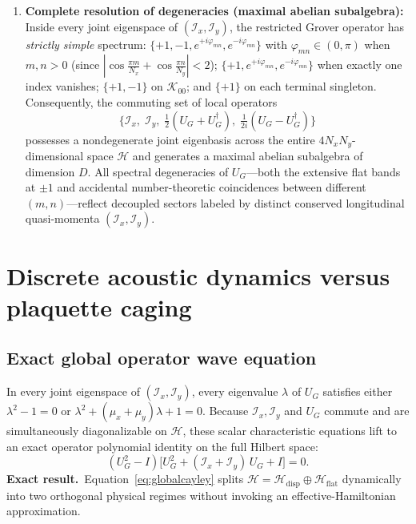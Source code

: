 \documentclass[11pt,a4paper,oneside]{report}
\newcommand{\HH}{\mathcal H}
\newcommand{\Id}{I}
\newcommand{\sw}{\mathrm{SW}}
\newcommand{\exact}{\textbf{Exact result.}\ }
\numberwithin{equation}{chapter}
\begin{document}
\begin{enumerate}
\begin{center}
\begin{tabular}{@{}llll@{}}
\(\big(\cos\frac{\pi m}{N_x},\,-1\big)\) & \(0\le m<N_x\) & \(\mathcal E_m^V\) & \(1\)\\\bottomrule
\end{tabular}
\end{center}
By Lagrange interpolation over the distinct pairs \((\mu_x,\mu_y)\), every
mode projector \(P_a\in\mathscr P_{\sw}\) is an explicit bivariate
polynomial in \(\mathcal I_x\) and \(\mathcal I_y\): the entire commutative
standing-wave algebra \(\mathcal A_{\sw}\) is generated by just two local
integrals of motion.
\item \textbf{Complete resolution of degeneracies (maximal abelian subalgebra):}
Inside every joint eigenspace of \((\mathcal I_x,\mathcal I_y)\), the
restricted Grover operator has \emph{strictly simple} spectrum:
\(\{+1,-1,e^{+i\varphi_{mn}},e^{-i\varphi_{mn}}\}\) with
\(\varphi_{mn}\in(0,\pi)\) when \(m,n>0\) (since
\(|\cos\tfrac{\pi m}{N_x}+\cos\tfrac{\pi n}{N_y}|<2\));
\(\{+1,e^{+i\varphi_{mn}},e^{-i\varphi_{mn}}\}\) when exactly one index
vanishes; \(\{+1,-1\}\) on \(\mathcal K_{00}\); and \(\{+1\}\) on each
terminal singleton. Consequently, the commuting set of local operators
\begin{equation}
\Big\{\mathcal I_x,\;\mathcal I_y,\;\tfrac12(U_G+U_G^\dagger),\;
\tfrac1{2i}(U_G-U_G^\dagger)\Big\}
\end{equation}
possesses a nondegenerate joint eigenbasis across the entire
\(4N_xN_y\)-dimensional space \(\HH\) and generates a maximal abelian
subalgebra of dimension \(D\). All spectral degeneracies of \(U_G\)---both
the extensive flat bands at \(\pm1\) and accidental number-theoretic
coincidences between different \((m,n)\)---reflect decoupled sectors labeled
by distinct conserved longitudinal quasi-momenta \((\mathcal I_x,\mathcal I_y)\).
\end{enumerate}

\section{Discrete acoustic dynamics versus plaquette caging}
\label{sec:acousticsplaquettes}

\subsection{Exact global operator wave equation}

In every joint eigenspace of \((\mathcal I_x,\mathcal I_y)\), every
eigenvalue \(\lambda\) of \(U_G\) satisfies either \(\lambda^2-1=0\) or
\(\lambda^2+(\mu_x+\mu_y)\lambda+1=0\). Because \(\mathcal I_x,\mathcal I_y\)
and \(U_G\) commute and are simultaneously diagonalizable on \(\HH\), these
scalar characteristic equations lift to an exact operator polynomial identity
on the full Hilbert space:
\begin{equation}
\boxed{
(U_G^2-\Id)\Big[U_G^2+(\mathcal I_x+\mathcal I_y)\,U_G+\Id\Big]=0.
}
\label{eq:globalcayley}
\end{equation}
\exact Equation~\eqref{eq:globalcayley} splits \(\HH=\HH_{\mathrm{disp}}\oplus\HH_{\mathrm{flat}}\)
dynamically into two orthogonal physical regimes without invoking an
effective-Hamiltonian approximation.
\end{document}
